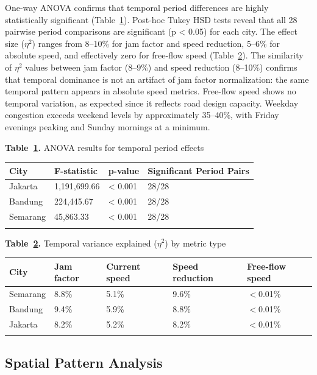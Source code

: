 \documentclass[12pt,a4paper]{article}
\begin{document}
One-way ANOVA confirms that temporal period differences are highly statistically significant (Table~\ref{tab:table_anova}). Post-hoc Tukey HSD tests reveal that all 28 pairwise period comparisons are significant (p < 0.05) for each city. The effect size ($\eta^2$) ranges from 8--10\% for jam factor and speed reduction, 5--6\% for absolute speed, and effectively zero for free-flow speed (Table~\ref{tab:speed_validation}). The similarity of $\eta^2$ values between jam factor (8--9\%) and speed reduction (8--10\%) confirms that temporal dominance is not an artifact of jam factor normalization: the same temporal pattern appears in absolute speed metrics. Free-flow speed shows no temporal variation, as expected since it reflects road design capacity. Weekday congestion exceeds weekend levels by approximately 35--40\%, with Friday evenings peaking and Sunday mornings at a minimum.

\textbf{Table~\ref{tab:table_anova}.} ANOVA results for temporal period effects

\begin{longtable}[]{@{}llll@{}}
\toprule\noalign{}
City & F-statistic & p-value & Significant Period Pairs \\
\midrule\noalign{}
\endhead
\bottomrule\noalign{}
\endlastfoot
Jakarta & 1,191,699.66 & < 0.001 & 28/28 \\
Bandung & 224,445.67 & < 0.001 & 28/28 \\
Semarang & 45,863.33 & < 0.001 & 28/28 \\
\label{tab:table_anova}
\end{longtable}

\textbf{Table~\ref{tab:speed_validation}.} Temporal variance explained ($\eta^2$) by metric type

\begin{longtable}[]{@{}lllll@{}}
\toprule\noalign{}
City & Jam factor & Current speed & Speed reduction & Free-flow speed \\
\midrule\noalign{}
\endhead
\bottomrule\noalign{}
\endlastfoot
Semarang & 8.8\% & 5.1\% & 9.6\% & $<$0.01\% \\
Bandung & 9.4\% & 5.9\% & 8.8\% & $<$0.01\% \\
Jakarta & 8.2\% & 5.2\% & 8.2\% & $<$0.01\% \\
\label{tab:speed_validation}
\end{longtable}

\subsection{Spatial Pattern Analysis}
\end{document}
